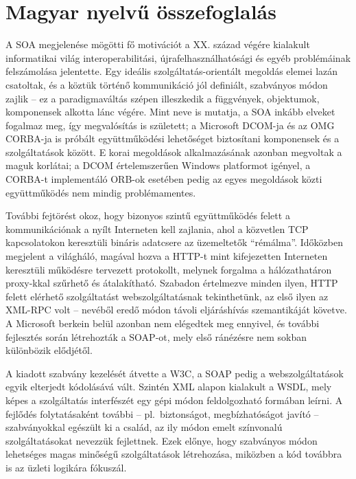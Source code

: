 \chapter*{Magyar nyelvű összefoglalás}

A SOA megjelenése mögötti fő motivációt a XX. század végére kialakult informatikai világ interoperabilitási, újrafelhasználhatósági és egyéb problémáinak felszámolása jelentette. Egy ideális szolgáltatás-orientált megoldás elemei lazán csatoltak, és a köztük történő kommunikáció jól definiált, szabványos módon zajlik -- ez a paradigmaváltás szépen illeszkedik a függvények, objektumok, komponensek alkotta lánc végére. Mint neve is mutatja, a SOA inkább elveket fogalmaz meg, így megvalósítás is született; a Microsoft DCOM-ja és az OMG CORBA-ja is próbált együttműködési lehetőséget biztosítani komponensek és a szolgáltatások között. E korai megoldások alkalmazásának azonban megvoltak a maguk korlátai; a DCOM értelemszerűen Windows platformot igényel, a CORBA-t implementáló ORB-ok esetében pedig az egyes megoldások közti együttműködés nem mindig problémamentes.

További fejtörést okoz, hogy bizonyos szintű együttműködés felett a kommunikációnak a nyílt Interneten kell zajlania, ahol a közvetlen TCP kapcsolatokon keresztüli bináris adatcsere az üzemeltetők ``rémálma''. Időközben megjelent a világháló, magával hozva a HTTP-t mint kifejezetten Interneten keresztüli működésre tervezett protokollt, melynek forgalma a hálózathatáron proxy-kkal szűrhető és átalakítható. Szabadon értelmezve minden ilyen, HTTP felett elérhető szolgáltatást webszolgáltatásnak tekinthetünk, az első ilyen az XML-RPC volt -- nevéből eredő módon távoli eljáráshívás szemantikáját követve. A Microsoft berkein belül azonban nem elégedtek meg ennyivel, és további fejlesztés során létrehozták a SOAP-ot, mely első ránézésre nem sokban különbözik elődjétől.

\bigskip

A kiadott szabvány kezelését átvette a W3C, a SOAP pedig a webszolgáltatások egyik elterjedt kódolásává vált. Szintén XML alapon kialakult a WSDL, mely képes a szolgáltatás interfészét egy gépi módon feldolgozható formában leírni. A fejlődés folytatásaként további -- pl.\ biztonságot, megbízhatóságot javító -- szabványokkal egészült ki a család, az ily módon emelt színvonalú szolgáltatásokat nevezzük fejlettnek. Ezek előnye, hogy szabványos módon lehetséges magas minőségű szolgáltatások létrehozása, miközben a kód továbbra is az üzleti logikára fókuszál.


